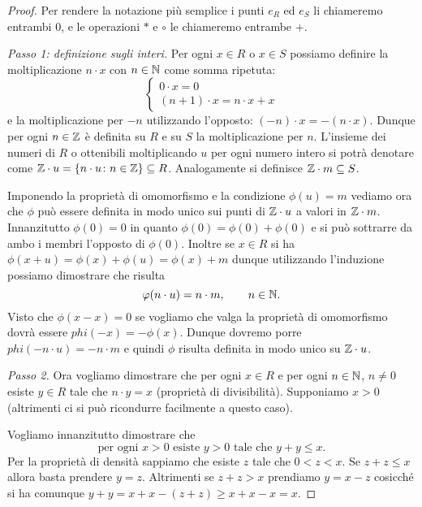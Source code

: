 \begin{proof}
Per rendere la notazione più semplice
i punti $e_R$ ed $e_S$ li chiameremo entrambi $0$,
e le operazioni $*$ e $\circ$ le chiameremo entrambe $+$.

\emph{Passo 1: definizione sugli interi.}
Per ogni $x\in R$ o $x\in S$ possiamo definire la moltiplicazione 
$n\cdot x$ con $n\in {\mathbb N}$ come somma ripetuta:
\[
  \begin{cases}
    0\cdot x = 0\\
    (n+1)\cdot x = n\cdot x + x
  \end{cases}
\]
e la moltiplicazione per $-n$ utilizzando l'opposto:
$(-n)\cdot x = -(n\cdot x)$. 
Dunque per ogni $n\in {\mathbb Z}$ è definita su $R$ e su $S$ la moltiplicazione per $n$.
L'insieme dei numeri di $R$ o ottenibili moltiplicando $u$ per ogni numero intero
si potrà denotare come ${\mathbb Z}\cdot u = {\left\{ n\cdot u\colon n\in {\mathbb Z} \right\}}\subseteq R$.
Analogamente si definisce ${\mathbb Z}\cdot m\subseteq S$.

Imponendo la proprietà di omomorfismo e la condizione $\phi(u)=m$
vediamo ora che $\phi$ può essere definita in modo unico 
sui punti di ${\mathbb Z}\cdot u$ a valori in ${\mathbb Z}\cdot m$.
Innanzitutto $\phi(0) = 0$ in quanto $\phi(0)=\phi(0)+\phi(0)$
e si può sottrarre da ambo i membri l'opposto di $\phi(0)$.
Inoltre se $x\in R$ si ha $\phi(x+u)=\phi(x)+\phi(u)=\phi(x)+m$
dunque utilizzando l'induzione possiamo dimostrare 
che risulta 
\[
   \varphi(n\cdot u) = n\cdot m, \qquad n\in {\mathbb N}.
\]
Visto che $\phi(x-x)=0$ se vogliamo che valga la proprietà di omomorfismo
dovrà essere $phi(-x) = -\phi(x)$.
Dunque dovremo porre $phi(-n\cdot u) = -n\cdot m$ e quindi 
$\phi$ risulta definita in modo unico su ${\mathbb Z}\cdot u$.

\emph{Passo 2.} 
Ora vogliamo dimostrare che per ogni $x\in R$ e per ogni $n\in {\mathbb N}$, $n\neq 0$
esiste $y\in R$ tale che $n\cdot y=x$ (proprietà di divisibilità).
Supponiamo $x>0$ (altrimenti ci si può ricondurre facilmente a questo caso).

Vogliamo innanzitutto dimostrare che 
\begin{equation}\label{eq:4109563}
  \text{per ogni $x>0$ esiste 
  $y>0$ tale che $y+y\le x$}. 
\end{equation}
Per la proprietà di densità sappiamo che esiste $z$ tale che 
$0<z<x$. Se $z+z\le x$ allora basta prendere $y=z$.
Altrimenti se $z+z>x$ prendiamo $y=x-z$ cosicché si ha comunque
$y+y = x+x-(z+z) \ge x+x-x = x$.


\end{proof}
